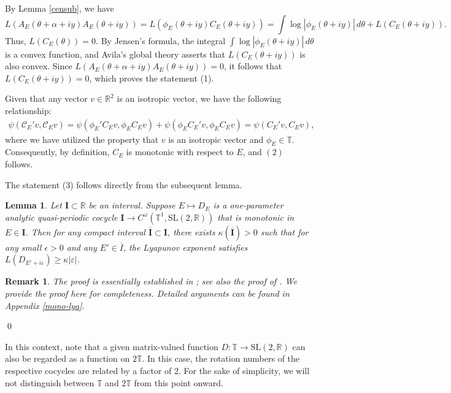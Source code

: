 \documentclass[11pt]{amsart}
\newtheorem{lemma}[theorem]{Lemma}
\newtheorem{rem}[theorem]{Remark}
\theoremstyle{remark}
\theoremstyle{definition}
\newcommand{\I}{{\mathbf I}}
\newcommand{\T}{{\mathbf T}}
\def\T{{\mathbb T}}
\begin{document}
By Lemma \ref{censub}, we have
\[
L\left(A_E(\theta+\alpha+iy)A_E(\theta+iy)\right) = L\left(\phi_E(\theta+iy)C_E(\theta+iy)\right) = \int \log \left| \phi_E(\theta+iy) \right| \, d\theta + L\left(C_E(\theta+iy)\right).
\]
Thus, \( L(C_E(\theta)) = 0 \). By Jensen's formula, the integral \( \int \log \left| \phi_E(\theta+iy) \right| \, d\theta \) is a convex function, and Avila's global theory \cite{avila} asserts that \( L(C_E(\theta+iy)) \) is also convex. Since \( L\left(A_E(\theta+\alpha+iy)A_E(\theta+iy)\right) = 0 \), it follows that \( L(C_E(\theta+iy)) = 0 \), which proves the statement (1). 


Given that any vector $ v \in \mathbb{R}^2 $ is an isotropic vector, we have the following relationship:
$$
\begin{aligned}
\psi(\mathcal{C}_E'v, \mathcal{C}_Ev) =
\psi(\phi_E' C_Ev, \phi_E C_Ev) + \psi(\phi_E C_E'v, \phi_E C_Ev) = \psi(C_E'v, C_Ev),
\end{aligned}
$$
where we have utilized the property that $ v $ is an isotropic vector and $ \phi_E \in \T $. Consequently, by definition, $ C_E $ is monotonic with respect to $ E $, and $(2)$ follows.

The statement (3) follows directly from the subsequent lemma.
\begin{lemma}\label{lem: complx LE} \cite{avila-kam,AK}
Let \( \I \subset \mathbb{R} \) be an interval. Suppose \( E \mapsto D_E \) is a one-parameter analytic quasi-periodic cocycle \( \I \to C^\omega(\mathbb{T}^1, \mathrm{SL}(2,\mathbb{R})) \) that is monotonic in \( E \in \I \). Then for any compact interval \( \overline{\I} \subset \I \), there exists \( \kappa(\overline{\I}) > 0 \) such that for any small \( \epsilon > 0 \) and any \( E' \in \overline{I} \), the Lyapunov exponent satisfies \( L(D_{E' + i\varepsilon}) \geq \kappa|\varepsilon| \).
\end{lemma}

\begin{rem}
The proof is essentially established in \cite{AK}; see also the proof of \cite[Lemma 7]{avila-kam}. We provide the proof here for completeness. Detailed arguments can be found in Appendix \ref{mono-lya}.
\end{rem}

\qed

In this context, note that a given matrix-valued function $ D: \mathbb{T} \rightarrow \mathrm{SL}(2, \mathbb{R}) $ can also be regarded as a function on $ 2\mathbb{T} $. In this case, the rotation numbers of the respective cocycles are related by a factor of 2. For the sake of simplicity, we will not distinguish between $ \mathbb{T} $ and $ 2\mathbb{T} $ from this point onward.
\end{document}
